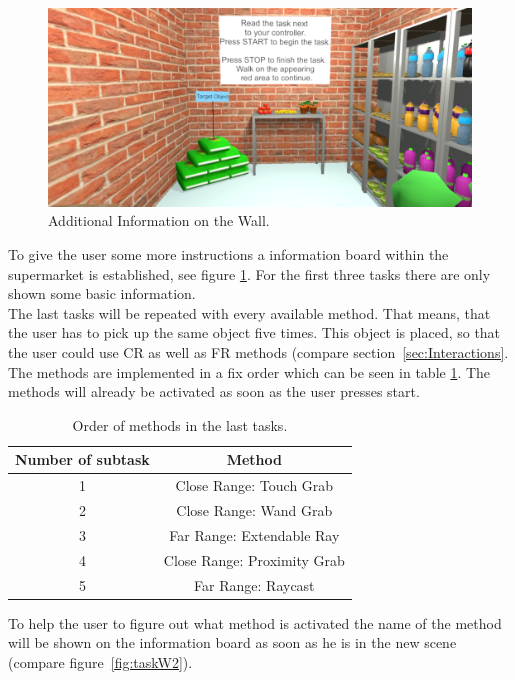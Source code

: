 \begin{figure}[H] 
	\center 
	\includegraphics[width=12cm]{Images/TaskWall_1.PNG}
	\caption[Additional Information on the Wall.]{Additional Information on the Wall.}
	\label{fig:taskW1}
\end{figure}

To give the user some more instructions a information board within the supermarket is established, see figure \ref{fig:taskW1}. For the first three tasks there are only shown some basic information.\\
The last tasks will be repeated with every available method. That means, that the user has to pick up the same object five times. This object is placed, so that the user could use CR as well as FR methods (compare section~\ref{sec:Interactions}. The methods are implemented in a fix order which can be seen in table \ref{tab: OrderMethods}. The methods will already be activated as soon as the user presses start. \\

\begin{table}[h]
\centering
 \begin{tabular}{|c|c|}
  Number of subtask & Method  \\ \hline
  1 & Close Range: Touch Grab  \\
  2 & Close Range: Wand Grab  \\
  3 & Far Range: Extendable Ray  \\
  4 & Close Range: Proximity Grab  \\
  5 & Far Range: Raycast \\
   \end{tabular}
  \caption[Order of methods in the last tasks.]{Order of methods in the last tasks.}
	\label{tab: OrderMethods}
 \end{table}

To help the user to figure out what method is activated the name of the method will be shown on the information board as soon as  he is in the new scene (compare figure~\ref{fig:taskW2}). 

